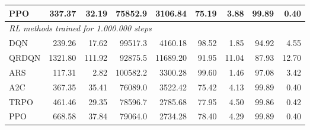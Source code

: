 \begin{samepage}
\begin{center}
\begin{tabular}{l|rr|rr|rr|rr}
    PPO          &   337.37 &    32.19 &    75852.9 &    3106.84 &   75.19 &    3.88 &   99.89 &    0.40 \\
    \midrule
    \multicolumn{9}{l}{\textit{RL methods trained for 1.000.000 steps}} \\
    \midrule
    DQN          &   239.26 &    17.62 &    99517.3 &    4160.18 &   98.52 &    1.85 &   94.92 &    4.55 \\
    QRDQN        &  1321.80 &   111.92 &    92875.5 &   11689.20 &   91.95 &   11.04 &   87.93 &   12.70 \\
    ARS          &   117.31 &     2.82 &   100582.2 &    3300.28 &   99.60 &    1.46 &   97.08 &    3.42 \\
    A2C          &   367.35 &    35.41 &    76089.0 &    3522.42 &   75.42 &    4.13 &   99.89 &    0.40 \\
    TRPO         &   461.46 &    29.35 &    78596.7 &    2785.68 &   77.95 &    4.50 &   99.86 &    0.42 \\
    PPO          &   668.58 &    37.84 &    79064.0 &    2734.28 &   78.40 &    4.29 &   99.89 &    0.40 \\
    \bottomrule
  \end{tabular}
\end{center}
\end{samepage}

